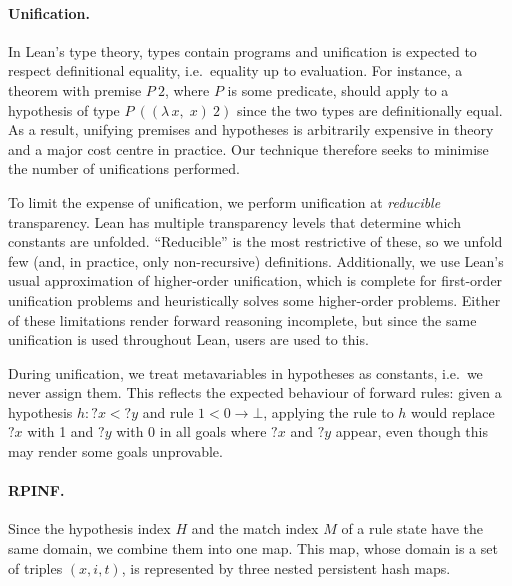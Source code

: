\documentclass[runningheads,leqno]{llncs}
\newcommand{\Lam}[2]{\ensuremath{\lambda\, #1,\; #2}}
\newcommand{\mvar}[1]{\ensuremath{?#1}}
\begin{document}
\paragraph{Unification.}
In Lean's type theory, types contain programs and unification is expected to respect definitional equality, i.e.\ equality up to evaluation.
For instance, a theorem with premise $P~2$, where $P$ is some predicate, should apply to a hypothesis of type $P~((\Lam{x}{x})~2)$ since the two types are definitionally equal.
As a result, unifying premises and hypotheses is arbitrarily expensive in theory and a major cost centre in practice.
Our technique therefore seeks to minimise the number of unifications performed.

To limit the expense of unification, we perform unification at \emph{reducible} transparency.
Lean has multiple transparency levels that determine which constants are unfolded.
\enquote{Reducible} is the most restrictive of these, so we unfold few (and, in practice, only non-recursive) definitions.
Additionally, we use Lean's usual approximation of higher-order unification, which is complete for first-order unification problems and heuristically solves some higher-order problems.
Either of these limitations render forward reasoning incomplete, but since the same unification is used throughout Lean, users are used to this.

During unification, we treat metavariables in hypotheses as constants, i.e.\ we never assign them.
This reflects the expected behaviour of forward rules: given a hypothesis $h : \mvar{x} < \mvar{y}$ and rule $1 < 0 → ⊥$, applying the rule to $h$ would replace $\mvar{x}$ with 1 and $\mvar{y}$ with 0 in all goals where $\mvar{x}$ and $\mvar{y}$ appear, even though this may render some goals unprovable.

\paragraph{RPINF.}
Since the hypothesis index $H$ and the match index $M$ of a rule state have the same domain, we combine them into one map.
This map, whose domain is a set of triples $(x, i, t)$, is represented by three nested persistent hash maps.
\end{document}
